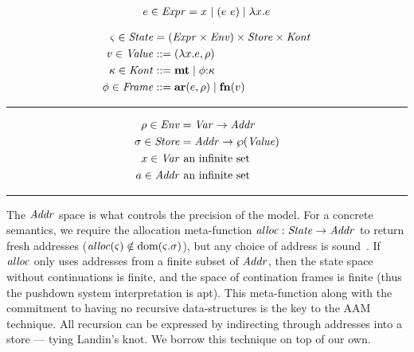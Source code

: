 {
\setlength{\abovedisplayskip}{0pt}
\setlength{\belowdisplayskip}{4pt}
\setlength{\abovedisplayshortskip}{0pt}
\setlength{\belowdisplayshortskip}{8pt}
\begin{align*}
  e \in \mathit{Expr} = x^{{}} \mathrel{\mid} (e\ e){} \mathrel{\mid} \lambda{} x. e
\end{align*}
\begin{minipage}[b]{.55\linewidth}
  \begin{align*}
  \varsigma \in \mathit{State} &= (\mathit{Expr} \times \mathit{Env}) \times \mathit{Store} \times \mathit{Kont} \\
  v \in \mathit{Value} &::= (\lambda{} x. e, \rho) \\
  \kappa \in \mathit{Kont} &::= \mathbf{mt} \mathrel{\mid} \phi{\tt :} \kappa \\
  \phi \in \mathit{Frame} &::= \mathbf{ar}{}(e,\rho) \mathrel{\mid} \mathbf{fn}{}(v)
  \end{align*}\hrule height 0pt\end{minipage}
\begin{minipage}[b]{.40\linewidth}
  \begin{align*}
  \rho \in \mathit{Env} &= \mathit{Var} \to \mathit{Addr} \\
  \sigma \in \mathit{Store} &= \mathit{Addr} \to \wp(\mathit{Value}) \\
  x \in \mathit{Var} &\text{ an infinite set} \\
  a \in \mathit{Addr} &\text{ an infinite set}
  \end{align*}\hrule height 0pt\end{minipage}
}

The $\mathit{Addr}$ space is what controls the precision of the model.
%
For a concrete semantics, we require the allocation meta-function $\mathit{alloc} :
\mathit{State} \to \mathit{Addr}$ to return fresh addresses ($\mathit{alloc}(\varsigma) \notin \text{dom}(\varsigma.\sigma)$), but any choice of address is sound~\citep{dvanhorn:Might2009Posteriori}.
%
If $\mathit{alloc}$ only uses addresses from a finite subset of $\mathit{Addr}$, then the state space without continuations is finite, and the space of contination frames is finite (thus the pushdown system interpretation is apt).
%
This meta-function along with the commitment to having no recursive data-structures is the key to the AAM technique.
%
All recursion can be expressed by indirecting through addresses into a store --- tying Landin's knot.
%
We borrow this technique on top of our own.

